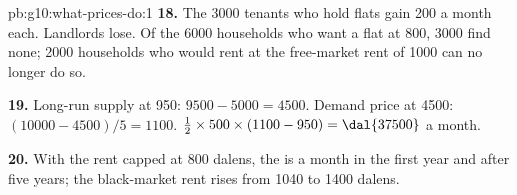 \begin{solution}{pb:g10:what-prices-do:1}
\textbf{18.} The 3000 tenants who hold flats gain 200 a month each. Landlords lose. Of the 6000 households who want a flat at 800, 3000 find none; \num{2000} households who would
rent at the free-market rent of 1000 can no longer do so.

\textbf{19.} Long-run supply at 950: $9500 - 5000 = 4500$. Demand price at 4500: $(10000 - 4500)/5 = 1100$.  $\tfrac12 \times 500 \times (1100 - 950) = \text{\dal{37500}}$ a month.

\textbf{20.} With the rent capped at 800 dalens, the  is  a month in the first year and  after five years; the black-market rent rises from 1040 to
1400 dalens.
\end{solution}
